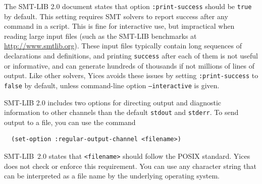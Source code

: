 \documentclass[11pt,twoside,fleqn,openright,titlepage]{cslreport}
\begin{document}
The SMT-LIB 2.0 document states that option \texttt{:print-success}
should be \texttt{true} by default. This setting requires SMT solvers
to report success after any command in a script. This is fine for
interactive use, but impractical when reading large input files (such
as the SMT-LIB benchmarks at \url{http://www.smtlib.org}). These
input files typically contain long sequences of declarations and
definitions, and printing \texttt{success} after each of them is not
useful or informative, and can generate hundreds of thousands if not
millions of lines of output.  Like other solvers, Yices avoids these
issues by setting \texttt{:print-success} to \texttt{false} by default,
unless command-line option \texttt{--interactive} is given.


\medskip\noindent SMT-LIB 2.0 includes two options for directing
output and diagnostic information to other channels than the default
\texttt{stdout} and \texttt{stderr}. To send output to a file, you can
use the command
\begin{small}
\begin{verbatim}
  (set-option :regular-output-channel <filename>)
\end{verbatim}
\end{small}
SMT-LIB~2.0 states that \texttt{<filename>} should follow the POSIX
standard. Yices does not check or enforce this requirement. You can
use any character string that can be interpreted as a file name by the
underlying operating system.






\end{document}
